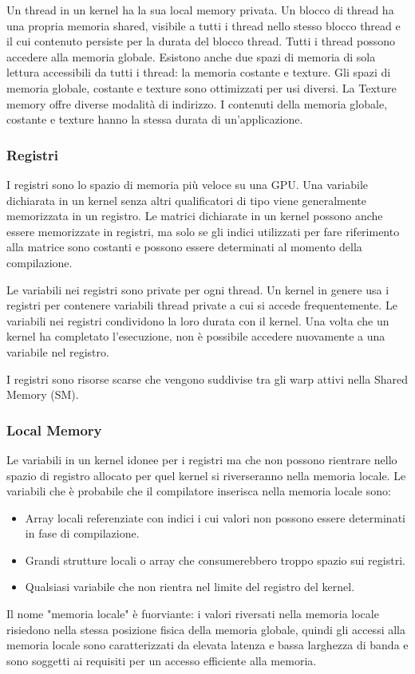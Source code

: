 Un thread in un kernel ha la sua local memory privata. Un blocco di thread ha una propria memoria shared, visibile a tutti i thread nello stesso blocco thread e il cui contenuto persiste per la durata del blocco thread. Tutti i thread possono accedere alla memoria globale. Esistono anche due spazi di memoria di sola lettura accessibili da tutti i thread: la memoria costante e texture. Gli spazi di memoria globale, costante e texture sono ottimizzati per usi diversi. La Texture memory offre diverse modalità di indirizzo. I contenuti della memoria globale, costante e texture hanno la stessa durata di un'applicazione.
\subsubsection{Registri}
I registri sono lo spazio di memoria più veloce su una GPU. Una variabile dichiarata in un kernel senza altri qualificatori di tipo viene generalmente memorizzata in un registro. Le matrici dichiarate in un kernel possono anche essere memorizzate in registri, ma solo se gli indici utilizzati per fare riferimento alla matrice sono costanti e possono essere determinati al momento della compilazione.

Le variabili nei registri sono private per ogni thread. Un kernel in genere usa i registri per contenere variabili thread private a cui si accede frequentemente. Le variabili nei registri condividono la loro durata con il kernel. Una volta che un kernel ha completato l'esecuzione, non è possibile accedere nuovamente a una variabile nel registro.

I registri sono risorse scarse che vengono suddivise tra gli warp attivi nella Shared Memory (SM).

\subsubsection{Local Memory}
Le variabili in un kernel idonee per i registri ma che non possono rientrare nello spazio di registro allocato per quel kernel si riverseranno nella memoria locale. Le variabili che è probabile che il compilatore inserisca nella memoria locale sono:
\begin{itemize}
	\item Array locali referenziate con indici i cui valori non possono essere determinati in fase di compilazione.
	\item Grandi strutture locali o array che consumerebbero troppo spazio sui registri.
	\item Qualsiasi variabile che non rientra nel limite del registro del kernel.
\end{itemize}
Il nome "memoria locale" è fuorviante: i valori riversati nella memoria locale risiedono nella stessa posizione fisica della memoria globale, quindi gli accessi alla memoria locale sono caratterizzati da elevata latenza e bassa larghezza di banda e sono soggetti ai requisiti per un accesso efficiente alla memoria.

